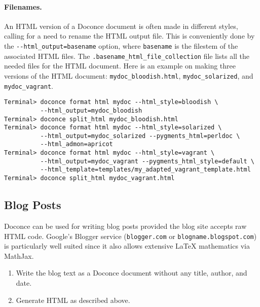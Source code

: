 \documentclass[%
oneside,                 %
final,                   %
10pt]{article}
\begin{document}
{{{\paragraph{Filenames.}
An HTML version of a Doconce document is often made in different styles,
calling for a need to rename the HTML output file. This is conveniently
done by the {\fontsize{10pt}{10pt}\Verb!--html_output=basename!} option, where {\fontsize{10pt}{10pt}\Verb!basename!} is the
filestem of the associated HTML files. The
{\fontsize{10pt}{10pt}\Verb!.basename_html_file_collection!} file lists all the needed files
for the HTML document. Here is an example on making three versions of
the HTML document: {\fontsize{10pt}{10pt}\Verb!mydoc_bloodish.html!}, {\fontsize{10pt}{10pt}\Verb!mydoc_solarized!}, and
{\fontsize{10pt}{10pt}\Verb!mydoc_vagrant!}.

\vspace{4pt}
\begin{Verbatim}[numbers=none,frame=lines,fontsize=\fontsize{9pt}{9pt},labelposition=topline,framesep=2.5mm,framerule=0.7pt]
Terminal> doconce format html mydoc --html_style=bloodish \ 
          --html_output=mydoc_bloodish
Terminal> doconce split_html mydoc_bloodish.html
Terminal> doconce format html mydoc --html_style=solarized \ 
          --html_output=mydoc_solarized --pygments_html=perldoc \ 
          --html_admon=apricot
Terminal> doconce format html mydoc --html_style=vagrant \ 
          --html_output=mydoc_vagrant --pygments_html_style=default \ 
          --html_template=templates/my_adapted_vagrant_template.html
Terminal> doconce split_html mydoc_vagrant.html
\end{Verbatim}

\subsection{Blog Posts}

Doconce can be used for writing blog posts provided the blog site accepts
raw HTML code. Google's Blogger service ({\fontsize{10pt}{10pt}\Verb!blogger.com!} or
{\fontsize{10pt}{10pt}\Verb!blogname.blogspot.com!}) is particularly well suited since it also
allows extensive {\LaTeX} mathematics via MathJax.

\begin{enumerate}
\item Write the blog text as a Doconce document without any
   title, author, and date.

\item Generate HTML as described above.


\end{enumerate}}}}
\end{document}
